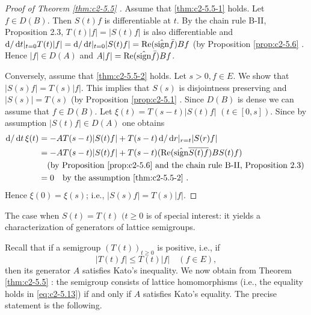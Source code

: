 \begin{proof}[Proof of Theorem \ref{thm:c2-5.5}  ]
Assume that \ref{thm:c2-5.5-1}   holds. 
Let $f \in D(B)$. 
Then $S(t)f$ is differentiable at $t$. 
By the chain rule B-II, Proposition 2.3,
$T(t)|f| = |S(t)f|$ is also differentiable and $\mathop{}\!\mathrm{d}{}/\mathop{}\!\mathrm{d}{t}|_{t=0} T(t)|f| = \mathop{}\!\mathrm{d}{}/\mathop{}\!\mathrm{d}{t}|_{t=0} |S(t)f| = \mathop{}\!\mathrm{Re}(\hat{\operatorname{sign}}  \bar{f})Bf$ (by  Proposition \ref{prop:c2-5.6}  .
Hence $|f| \in D(A)$ and $A|f| = \mathop{}\!\mathrm{Re}(\hat{\operatorname{sign}}  \bar{f})Bf$.

Conversely, assume that \ref{thm:c2-5.5-2}   holds. 
Let $s > 0, f \in E$. 
We show that $|S(s)f| = T(s)|f|$. 
This implies that $S(s)$ is disjointness preserving and $|S(s)| = T(s)$ (by Proposition \ref{prop:c2-5.1}  . 
Since $D(B)$ is dense we can assume that $f \in D(B)$. 
Let $\xi(t) = T(s-t)|S(t)f|$ $(t \in [0,s])$.
Since by assumption $|S(t)f| \in D(A)$ one obtains
\begin{align*}
\mathop{}\!\mathrm{d}{}/\mathop{}\!\mathrm{d}{t} \, \xi(t) &= -AT(s-t)|S(t)f| + T(s-t)\mathop{}\!\mathrm{d}{}/\mathop{}\!\mathrm{d}{r}|_{r=t} |S(r)f|\\
&= -AT(s-t)|S(t)f| + T(s-t)(\mathop{}\!\mathrm{Re}(\hat{\operatorname{sign}}  \overline{S(t)f})BS(t)f)\\
&\quad \text{(by  Proposition \ref{prop:c2-5.6}   and the chain rule B-II, Proposition 2.3)
}\\
&= 0 \quad \text{by the assumption \ref{thm:c2-5.5-2}  }.
\end{align*}
Hence $\xi(0) = \xi(s)$; i.e., $|S(s)f| = T(s)|f|$.
\end{proof}

The case when $S(t) = T(t)$ $(t \geq 0$ is of special interest: it yields a characterization of generators of lattice semigroups.

Recall that if a semigroup $(T(t))_{t \geq 0}$ is positive, i.e., if
\begin{equation}\label{eq:c2-5.13}
|T(t)f| \leq T(t) |f| \quad (f \in E) ,
\end{equation}
then its generator $A$ satisfies Kato's inequality. 
We now obtain from Theorem \ref{thm:c2-5.5}  : the semigroup consists of lattice homomorphisms (i.e., the equality holds in \eqref{eq:c2-5.13}) if and only if $A$ satisfies Kato's equality. 
The precise statement is the following.

